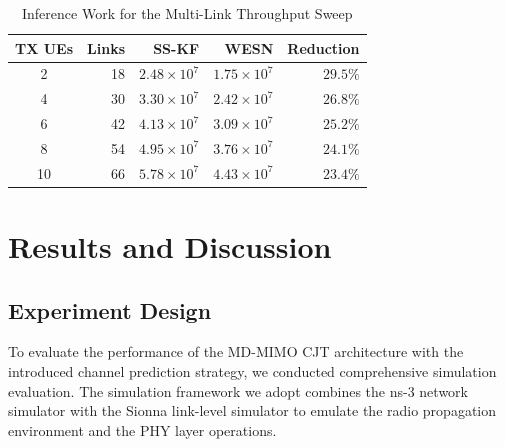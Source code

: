 \documentclass[lettersize,journal]{IEEEtran}
\begin{document}
\begin{table}[t]
\centering
\caption{Inference Work for the Multi-Link Throughput Sweep}
\label{tab:system_complexity_comparison}
\begin{tabular}{c r r r r}
\toprule
TX UEs & Links & SS-KF & WESN & Reduction\\
\midrule
2  & 18 & $2.48\times10^{7}$ & $1.75\times10^{7}$ & $29.5\%$\\
4  & 30 & $3.30\times10^{7}$ & $2.42\times10^{7}$ & $26.8\%$\\
6  & 42 & $4.13\times10^{7}$ & $3.09\times10^{7}$ & $25.2\%$\\
8  & 54 & $4.95\times10^{7}$ & $3.76\times10^{7}$ & $24.1\%$\\
10 & 66 & $5.78\times10^{7}$ & $4.43\times10^{7}$ & $23.4\%$\\
\bottomrule
\end{tabular}
\end{table}

\section{Results and Discussion}
\subsection{Experiment Design}
\label{sec:sim_design}

To evaluate the performance of the MD-MIMO CJT architecture with the introduced channel prediction strategy, we conducted comprehensive simulation evaluation. 
The simulation framework we adopt combines the ns-3 network simulator with the Sionna link-level simulator to emulate the radio propagation environment and the PHY layer operations.
\end{document}

